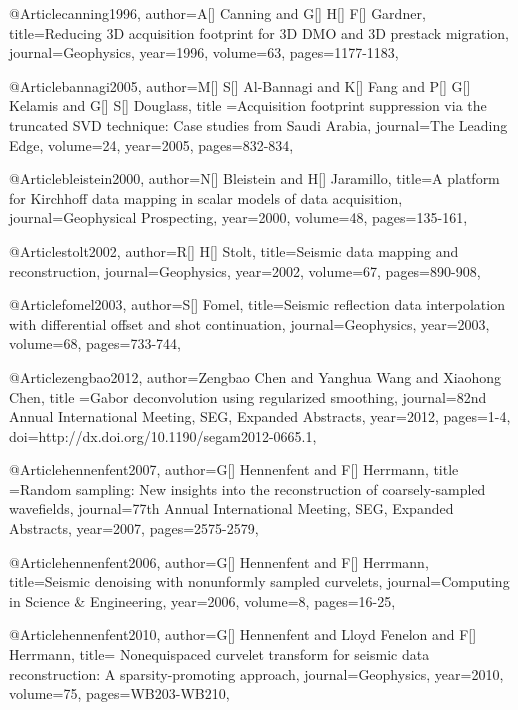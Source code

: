 {@Article{canning1996,
  author={A[] Canning and G[] H[] F[] Gardner},
  title={Reducing 3{D} acquisition footprint for 3{D} DMO and 3{D} prestack migration},
  journal={Geophysics},
  year=1996,
  volume=63,
  pages={1177-1183},
}

@Article{bannagi2005,
  author={M[] S[] Al-Bannagi and K[] Fang and P[] G[] Kelamis and G[] S[] Douglass},
  title ={Acquisition footprint suppression via the truncated SVD technique: Case studies from Saudi Arabia},
  journal={The Leading Edge},
  volume=24,
  year=2005,
  pages={832-834},
}

@Article{bleistein2000,
  author={N[] Bleistein and H[] Jaramillo},
  title={A platform for Kirchhoff data mapping in scalar models of data acquisition},
  journal={Geophysical Prospecting},
  year=2000,
  volume=48,
  pages={135-161},
}

@Article{stolt2002,
  author={R[] H[] Stolt},
  title={Seismic data mapping and reconstruction},
  journal={Geophysics},
  year=2002,
  volume=67,
  pages={890-908},
}


@Article{fomel2003,
  author={S[] Fomel},
  title={Seismic reflection data interpolation with differential offset and shot continuation},
  journal={Geophysics},
  year=2003,
  volume=68,
  pages={733-744},
}

@Article{zengbao2012,
  author={Zengbao Chen and Yanghua Wang and Xiaohong Chen},
  title ={Gabor deconvolution using regularized smoothing},
  journal={82nd Annual International Meeting, SEG, Expanded Abstracts},
  year=2012,
  pages={1-4},
  doi={http://dx.doi.org/10.1190/segam2012-0665.1},
}

@Article{hennenfent2007,
  author={G[] Hennenfent and F[] Herrmann},
  title ={Random sampling: New insights into the reconstruction of coarsely-sampled wavefields},
  journal={77th Annual International Meeting, SEG, Expanded Abstracts},
  year=2007,
  pages={2575-2579},
}

@Article{hennenfent2006,
  author={G[] Hennenfent and F[] Herrmann},
  title={Seismic denoising with nonunformly sampled curvelets},
  journal={Computing in Science \& Engineering},
  year=2006,
  volume=8,
  pages={16-25},
}

@Article{hennenfent2010,
  author={G[] Hennenfent and Lloyd Fenelon and F[] Herrmann},
  title={	
Nonequispaced curvelet transform for seismic data reconstruction: A sparsity-promoting approach},
  journal={Geophysics},
  year=2010,
  volume=75,
  pages={WB203-WB210},
}

}
